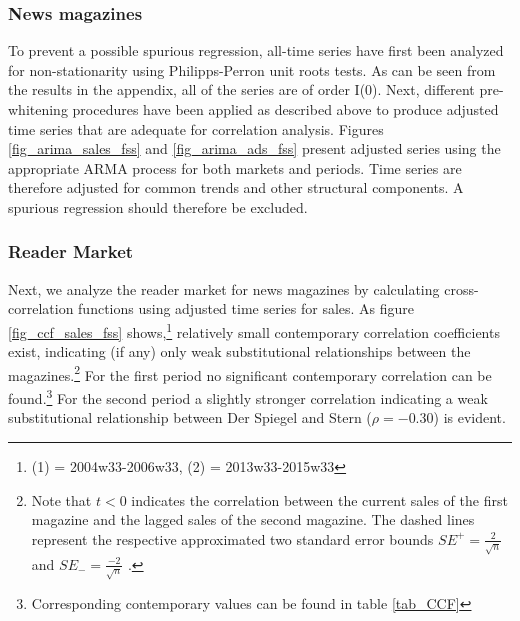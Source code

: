 \documentclass[12pt,a4paper,notitlepage]{article}
\begin{document}
\subsubsection{News magazines}

To prevent a possible spurious regression, all-time series have first been analyzed for non-stationarity using Philipps-Perron unit roots tests. As can be seen from the results in the appendix, all of the series are of order I(0). Next, different pre-whitening procedures have been applied as described above to produce adjusted time series that are adequate for correlation analysis. Figures \ref{fig_arima_sales_fss} and \ref{fig_arima_ads_fss} present adjusted series using the appropriate ARMA process for both markets and periods. Time series are therefore adjusted for common trends and other structural components. A spurious regression should therefore be excluded.  

\subsubsection{Reader Market}

Next, we analyze the reader market for news magazines by calculating cross-correlation functions using adjusted time series for sales. As figure \ref{fig_ccf_sales_fss} shows,\footnote{(1) = 2004w33-2006w33, (2) = 2013w33-2015w33} relatively small contemporary correlation coefficients exist, indicating (if any) only weak substitutional relationships between the magazines.\footnote{Note that $t<0$ indicates the correlation between the current sales of the first magazine and the lagged sales of the second magazine. The dashed lines represent the respective approximated two standard error bounds $SE^+=\frac{2}{\sqrt{n}}$ and $SE_-=\frac{-2}{\sqrt{n}}$ \citep{tiao_modeling_1981}.} For the first period no significant contemporary correlation can be found.\footnote{Corresponding contemporary values can be found in table \ref{tab_CCF}} For the second period a slightly stronger correlation indicating a weak substitutional relationship between Der Spiegel and Stern ($\rho=-0.30$) is evident.
\end{document}
